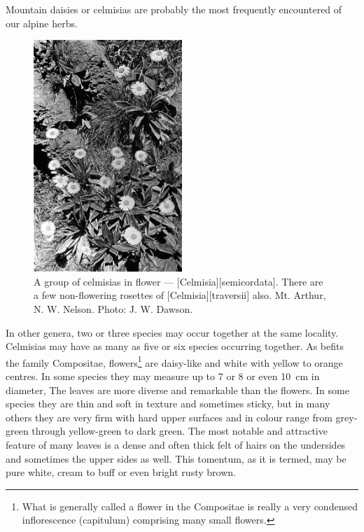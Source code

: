 Mountain daisies or celmisias are probably the most frequently encountered of our alpine herbs.
\begin{figure}
	\includegraphics[width=0.5\textwidth]{graphics/figure102celmisias.jpg}
	\centering
	\caption[A group of celmisias in flower]{A group of celmisias in flower --- [Celmisia][semicordata].
	There are a few non-flowering rosettes of [Celmisia][traversii] also.
	Mt. Arthur,  N. W. Nelson.
	Photo: J. W. Dawson.}%
	\label{fig:102celmisias}
\end{figure}
In other genera, two or three species may occur together at the same locality.
Celmisias may have as many as five or six species occurring together.
As befits the family Compositae,  flowers\footnote{What is generally called a flower in the Compositae is really a very condensed inflorescence (capitulum) comprising many small flowers.} are daisy-like and white with yellow to orange centres.
In some species they may measure up to 7 or 8 or even \SI{10}{\centi\metre} in diameter, The leaves are more diverse and remarkable than the flowers.
In some species they are thin and soft in texture and sometimes sticky, but in many others they are very firm with hard upper surfaces and in colour range from grey-green through yellow-green to dark green.
The most notable and attractive feature of many  leaves is a dense and often thick felt of hairs on the undersides and sometimes the upper sides as well.
This tomentum, as it is termed, may be pure white, cream to buff or even bright rusty brown.

